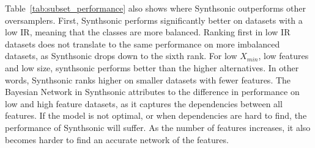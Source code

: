 Table~\ref{tab:subset_performance} also shows where Synthsonic outperforms other oversamplers. First, Synthsonic performs significantly better on datasets with a low IR, meaning that the classes are more balanced. Ranking first in low IR datasets does not translate to the same performance on more imbalanced datasets, as Synthsonic drops down to the sixth rank. For low $X_{min}$, low features and low size, synthsonic performs better than the higher alternatives. In other words, Synthsonic ranks higher on smaller datasets with fewer features. The Bayesian Network in Synthsonic attributes to the difference in performance on low and high feature datasets, as it captures the dependencies between all features. If the model is not optimal, or when dependencies are hard to find, the performance of Synthsonic will suffer. As the number of features increases, it also becomes harder to find an accurate network of the features. 

